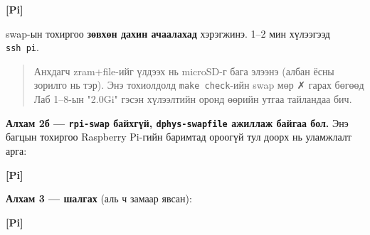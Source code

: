 \textbf{{[}Pi{]}}

\begin{Shaded}
\begin{Highlighting}[]
\OperatorTok{\textgreater{}}
\NormalTok{[Main]}

\NormalTok{[File]}
\end{Highlighting}
\end{Shaded}

swap-ын тохиргоо \textbf{зөвхөн дахин ачаалахад} хэрэгжинэ. 1--2 мин хүлээгээд \texttt{ssh\ pi}.

\begin{quote}
Анхдагч zram+file-ийг үлдээх нь microSD-г бага элээнэ (албан ёсны зорилго нь тэр). Энэ тохиолдолд \texttt{make\ check}-ийн swap мөр ✗ гарах бөгөөд Лаб 1--8-ын "2.0Gi" гэсэн хүлээлтийн оронд өөрийн утгаа тайландаа бич.
\end{quote}

\textbf{Алхам 2б --- \texttt{rpi-swap} байхгүй, \texttt{dphys-swapfile} ажиллаж байгаа бол.} Энэ багцын тохиргоо Raspberry Pi-гийн баримтад ороогүй тул доорх нь уламжлалт арга:

\textbf{{[}Pi{]}}

\begin{Shaded}
\begin{Highlighting}[]
\end{Highlighting}
\end{Shaded}

\textbf{Алхам 3 --- шалгах} (аль ч замаар явсан):

\textbf{{[}Pi{]}}

\begin{Shaded}
\begin{Highlighting}[]
\end{Highlighting}
\end{Shaded}

